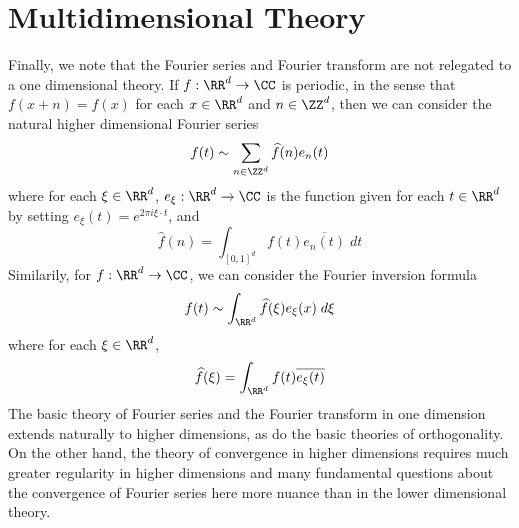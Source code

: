 \section{Multidimensional Theory}

Finally, we note that the Fourier series and Fourier transform are not relegated to a one dimensional theory. If $f: \RR^d \to \CC$ is periodic, in the sense that $f(x + n) = f(x)$ for each $x \in \RR^d$ and $n \in \ZZ^d$, then we can consider the natural higher dimensional Fourier series
%
\[ f(t) \sim \sum_{n \in \ZZ^d} \widehat{f}(n) e_n(t) \] 
%
where for each $\xi \in \RR^d$, $e_\xi: \RR^d \to \CC$ is the function given for each $t \in \RR^d$ by setting $e_\xi(t) = e^{2 \pi i \xi \cdot t}$, and
%
\[ \widehat{f}(n) = \int_{[0,1]^d} f(t) \overline{e_n(t)}\; dt \]
%
Similarily, for $f: \RR^d \to \CC$, we can consider the Fourier inversion formula
%
\[ f(t) \sim \int_{\RR^d} \widehat{f}(\xi) e_\xi(x)\; d\xi \]
%
where for each $\xi \in \RR^d$,
%
\[ \widehat{f}(\xi) = \int_{\RR^d} f(t) \overline{e_\xi(t)} \]
%
The basic theory of Fourier series and the Fourier transform in one dimension extends naturally to higher dimensions, as do the basic theories of orthogonality. On the other hand, the theory of convergence in higher dimensions requires much greater regularity in higher dimensions and many fundamental questions about the convergence of Fourier series here more nuance than in the lower dimensional theory.

%

